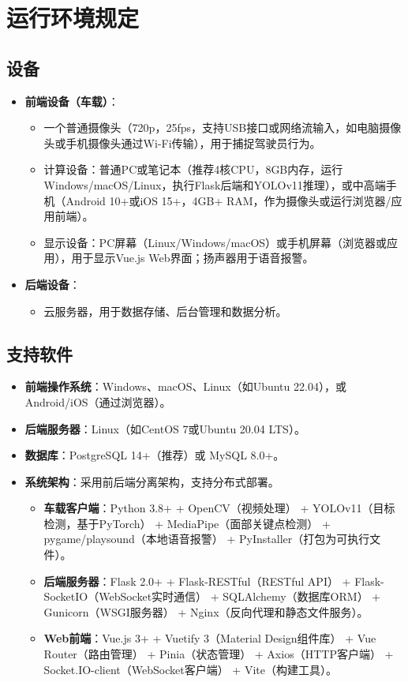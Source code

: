 \documentclass[a4paper,12pt]{article}
\begin{document}
\section{运行环境规定}

\subsection{设备}
\begin{itemize}
    \item \textbf{前端设备（车载）}：
    \begin{itemize}
        \item 一个普通摄像头（720p，25fps，支持USB接口或网络流输入，如电脑摄像头或手机摄像头通过Wi-Fi传输），用于捕捉驾驶员行为。
        \item 计算设备：普通PC或笔记本（推荐4核CPU，8GB内存，运行Windows/macOS/Linux，执行Flask后端和YOLOv11推理），或中高端手机（Android 10+或iOS 15+，4GB+ RAM，作为摄像头或运行浏览器/应用前端）。
        \item 显示设备：PC屏幕（Linux/Windows/macOS）或手机屏幕（浏览器或应用），用于显示Vue.js Web界面；扬声器用于语音报警。
    \end{itemize}
    \item \textbf{后端设备}：
    \begin{itemize}
        \item 云服务器，用于数据存储、后台管理和数据分析。
    \end{itemize}
\end{itemize}

\subsection{支持软件}
\begin{itemize}
    \item \textbf{前端操作系统}：Windows、macOS、Linux（如Ubuntu 22.04），或Android/iOS（通过浏览器）。
    \item \textbf{后端服务器}：Linux（如CentOS 7或Ubuntu 20.04 LTS）。
    \item \textbf{数据库}：PostgreSQL 14+（推荐）或 MySQL 8.0+。
    \item \textbf{系统架构}：采用前后端分离架构，支持分布式部署。
    \begin{itemize}
        \item \textbf{车载客户端}：Python 3.8+ + OpenCV（视频处理） + YOLOv11（目标检测，基于PyTorch） + MediaPipe（面部关键点检测） + pygame/playsound（本地语音报警） + PyInstaller（打包为可执行文件）。
        \item \textbf{后端服务器}：Flask 2.0+ + Flask-RESTful（RESTful API） + Flask-SocketIO（WebSocket实时通信） + SQLAlchemy（数据库ORM） + Gunicorn（WSGI服务器） + Nginx（反向代理和静态文件服务）。
        \item \textbf{Web前端}：Vue.js 3+ + Vuetify 3（Material Design组件库） + Vue Router（路由管理） + Pinia（状态管理） + Axios（HTTP客户端） + Socket.IO-client（WebSocket客户端） + Vite（构建工具）。
    \end{itemize}
\end{itemize}
\end{document}

